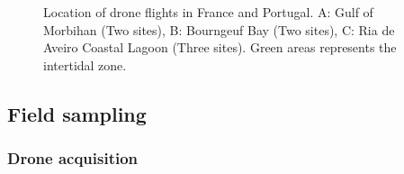 \documentclass[
  number]{elsarticle}
\begin{document}
\label{cell-fig-map}
\begin{figure}[H]


\caption{\label{fig-map}Location of drone flights in France and
Portugal. A: Gulf of Morbihan (Two sites), B: Bourngeuf Bay (Two sites),
C: Ria de Aveiro Coastal Lagoon (Three sites). Green areas represents
the intertidal zone.}

\end{figure}%

\subsection{Field sampling}\label{field-sampling}

\subsubsection{Drone acquisition}\label{drone-acquisition}
\end{document}
